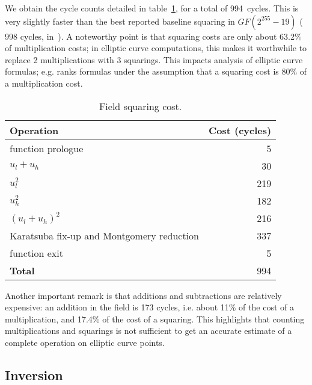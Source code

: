 \documentclass{llncs}
\newcommand{\GF}{GF}
\begin{document}
We obtain the cycle counts detailed in table~\ref{tab:fieldsqr}, for a
total of 994~cycles. This is very slightly faster than the best reported
baseline squaring in $\GF(2^{255}-19)$ ($998$ cycles,
in~\cite{HaaLab2019}). A noteworthy point is that squaring costs are
only about 63.2\% of multiplication costs; in elliptic curve
computations, this makes it worthwhile to replace 2 multiplications with
3 squarings. This impacts analysis of elliptic curve formulas; e.g.
\cite{EFD} ranks formulas under the assumption that a squaring cost is
80\% of a multiplication cost.

\begin{table}[H]
\begin{center}
    \begin{tabular}{|l|r|}
    \hline
    \textsf{\textbf{Operation}} & \textsf{\textbf{Cost (cycles)}} \\
    \hline
    function prologue                          &   5 \\
    $u_l+u_h$                                  &  30 \\
    $u_l^2$                                    & 219 \\
    $u_h^2$                                    & 182 \\
    $(u_l+u_h)^2$                              & 216 \\
    Karatsuba fix-up and Montgomery reduction  & 337 \\
    function exit                              &   5 \\
    \hline
    \textsf{\textbf{Total}}                    & 994 \\
    \hline
    \end{tabular}
\end{center}
\caption{\label{tab:fieldsqr}Field squaring cost.}
\end{table}

Another important remark is that additions and subtractions are
relatively expensive: an addition in the field is 173 cycles, i.e. about
11\% of the cost of a multiplication, and 17.4\% of the cost of a
squaring. This highlights that counting multiplications and squarings is
not sufficient to get an accurate estimate of a complete operation on
elliptic curve points.

\subsection{Inversion}\label{sec:field-ops-inv}
\end{document}
